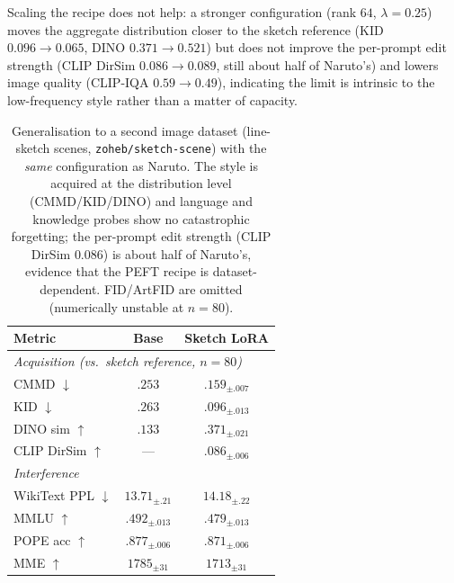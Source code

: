 \documentclass{article}
\begin{document}
Scaling the recipe does
not help: a stronger configuration (rank $64$, $\lambda{=}0.25$) moves the
aggregate distribution closer to the sketch reference (KID $0.096\!\to\!0.065$,
DINO $0.371\!\to\!0.521$) but does not improve the per-prompt edit strength
(CLIP DirSim $0.086\!\to\!0.089$, still about half of Naruto's) and lowers image
quality (CLIP-IQA $0.59\!\to\!0.49$), indicating the limit is intrinsic to the
low-frequency style rather than a matter of capacity.

\begin{table}[t]
\centering\small
\setlength{\tabcolsep}{12pt}
\begin{tabular}{lcc}
\toprule
\textbf{Metric} & \textbf{Base} & \textbf{Sketch LoRA} \\
\midrule
\multicolumn{3}{l}{\textit{Acquisition (vs.\ sketch reference, $n{=}80$)}}\\
CMMD $\downarrow$        & $.253$  & $\mathbf{.159}_{\pm.007}$ \\
KID $\downarrow$         & $.263$  & $\mathbf{.096}_{\pm.013}$ \\
DINO sim $\uparrow$      & $.133$  & $\mathbf{.371}_{\pm.021}$ \\
CLIP DirSim $\uparrow$   & ---     & $.086_{\pm.006}$ \\
\midrule
\multicolumn{3}{l}{\textit{Interference}}\\
WikiText PPL $\downarrow$ & $13.71_{\pm.21}$ & $14.18_{\pm.22}$ \\
MMLU $\uparrow$           & $.492_{\pm.013}$  & $.479_{\pm.013}$ \\
POPE acc $\uparrow$       & $.877_{\pm.006}$  & $.871_{\pm.006}$ \\
MME $\uparrow$            & $1785_{\pm31}$  & $1713_{\pm31}$ \\
\bottomrule
\end{tabular}
\caption{Generalisation to a second image dataset (line-sketch scenes,
\texttt{zoheb/sketch-scene}) with the \emph{same} configuration as Naruto. The
style is acquired at the distribution level (CMMD/KID/DINO) and language and
knowledge probes show no catastrophic forgetting; the per-prompt edit strength
(CLIP DirSim $0.086$) is about half of Naruto's, evidence that the PEFT recipe is
dataset-dependent. FID/ArtFID are omitted (numerically unstable at $n{=}80$).}
\label{tab:sketch}
\end{table}
\end{document}
